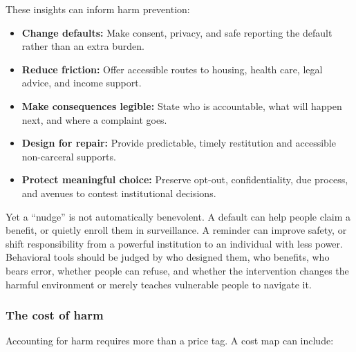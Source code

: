 \documentclass[
  11pt,
  letterpaper,
]{article}
\providecommand{\tightlist}{%
  \setlength{\itemsep}{0pt}\setlength{\parskip}{0pt}}
\begin{document}
These insights can inform harm prevention:

\begin{itemize}
\tightlist
\item
  \textbf{Change defaults:} Make consent, privacy, and safe reporting
  the default rather than an extra burden.
\item
  \textbf{Reduce friction:} Offer accessible routes to housing, health
  care, legal advice, and income support.
\item
  \textbf{Make consequences legible:} State who is accountable, what
  will happen next, and where a complaint goes.
\item
  \textbf{Design for repair:} Provide predictable, timely restitution
  and accessible non-carceral supports.
\item
  \textbf{Protect meaningful choice:} Preserve opt-out, confidentiality,
  due process, and avenues to contest institutional decisions.
\end{itemize}

Yet a ``nudge'' is not automatically benevolent. A default can help
people claim a benefit, or quietly enroll them in surveillance. A
reminder can improve safety, or shift responsibility from a powerful
institution to an individual with less power. Behavioral tools should be
judged by who designed them, who benefits, who bears error, whether
people can refuse, and whether the intervention changes the harmful
environment or merely teaches vulnerable people to navigate it.

\subsubsection{The cost of harm}\label{the-cost-of-harm}

Accounting for harm requires more than a price tag. A cost map can
include:
\end{document}
